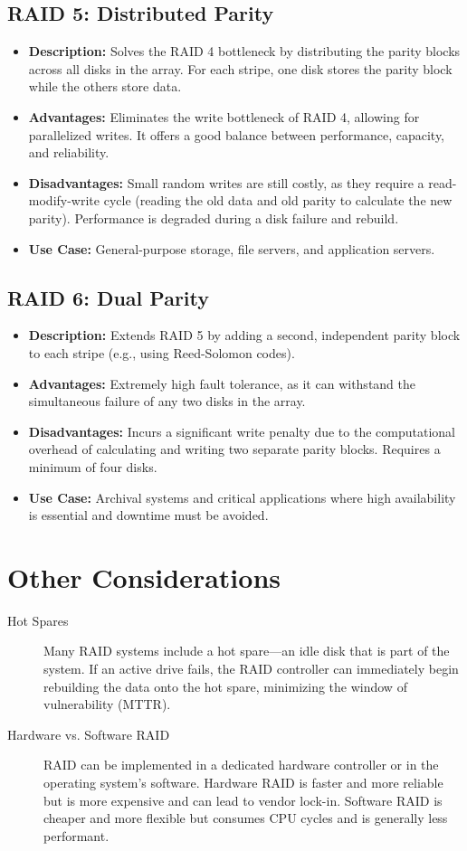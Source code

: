 \subsection{RAID 5: Distributed Parity}
\begin{itemize}
    \item \textbf{Description:} Solves the RAID 4 bottleneck by distributing the parity blocks across all disks in the array. For each stripe, one disk stores the parity block while the others store data.
    \item \textbf{Advantages:} Eliminates the write bottleneck of RAID 4, allowing for parallelized writes. It offers a good balance between performance, capacity, and reliability.
    \item \textbf{Disadvantages:} Small random writes are still costly, as they require a read-modify-write cycle (reading the old data and old parity to calculate the new parity). Performance is degraded during a disk failure and rebuild.
    \item \textbf{Use Case:} General-purpose storage, file servers, and application servers.
\end{itemize}

\subsection{RAID 6: Dual Parity}
\begin{itemize}
    \item \textbf{Description:} Extends RAID 5 by adding a second, independent parity block to each stripe (e.g., using Reed-Solomon codes).
    \item \textbf{Advantages:} Extremely high fault tolerance, as it can withstand the simultaneous failure of any two disks in the array.
    \item \textbf{Disadvantages:} Incurs a significant write penalty due to the computational overhead of calculating and writing two separate parity blocks. Requires a minimum of four disks.
    \item \textbf{Use Case:} Archival systems and critical applications where high availability is essential and downtime must be avoided.
\end{itemize}

\section{Other Considerations}

\begin{description}
    \item[Hot Spares] Many RAID systems include a hot spare—an idle disk that is part of the system. If an active drive fails, the RAID controller can immediately begin rebuilding the data onto the hot spare, minimizing the window of vulnerability (MTTR).
    \item[Hardware vs. Software RAID] RAID can be implemented in a dedicated hardware controller or in the operating system's software. Hardware RAID is faster and more reliable but is more expensive and can lead to vendor lock-in. Software RAID is cheaper and more flexible but consumes CPU cycles and is generally less performant.
\end{description}